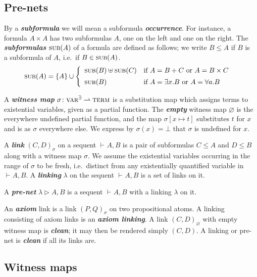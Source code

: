 \documentclass[UKenglish]{lipics-v2016}
\theoremstyle{plain}
\newcommand\defn[1]{\textit{\textbf{#1}}}
\newcommand\varE{\textsc{var}^\exists}
\newcommand\terms{\textsc{term}}
\newcommand\subs[1]{\textsc{sub}(#1)}
\newcommand\+{+}
\renewcommand\*{\times}
\newcommand\sub{\leq}
\newcommand\seq[3][]{{\vdash_{#1}}#2,#3}
\newcommand\net[3]{#1\triangleright #2,#3}
\newcommand\link[3][\sigma]{(#2,#3)_{#1}}
\begin{document}

\subsection{Pre-nets}

By a \defn{subformula} we will mean a subformula \defn{occurrence}. For instance, a formula $A\*A$ has two subformulas $A$, one on the left and one on the right. The \defn{subformulas} $\subs A$ of a formula are defined as follows; we write $B\sub A$ if $B$ is a subformula of $A$, i.e.\ if $B\in\subs A$.
\[
	\subs A = \{A\} \cup
	\left\{\begin{array}{ll}
		\subs B\uplus\subs C	& \text{if $A=B\+C$ or $A=B\*C$} \\[5pt]
		\subs B					& \text{if $A=\exists x.B$ or $A=\forall a.B$}
	\end{array}\right.
\]

A \defn{witness map} $\sigma\colon \varE \rightharpoonup \terms$ is a substitution map which assigns terms to existential variables, given as a partial function. The \defn{empty} witness map $\varnothing$ is the everywhere undefined partial function, and the map $\sigma[x\mapsto t]$ substitutes $t$ for $x$ and is as $\sigma$ everywhere else. We express by $\sigma(x)=\bot$ that $\sigma$ is undefined for $x$.

A \defn{link} $\link CD$ on a sequent $\seq AB$ is a pair of subformulas $C\leq A$ and $D\leq B$ along with a witness map $\sigma$. We assume the existential variables occurring in the range of $\sigma$ to be fresh, i.e.\ distinct from any existentially quantified variable in $\seq AB$. A \defn{linking} $\lambda$ on the sequent $\seq AB$ is a set of links on it.%

\begin{definition}
A \defn{pre-net} $\net\lambda AB$ is a sequent $\seq AB$ with a linking $\lambda$ on it.
\end{definition}

An \defn{axiom} link is a link $\link PQ$ on two propositional atoms. A linking consisting of axiom links is an \defn{axiom linking}. A link $\link[\varnothing]CD$ with empty witness map is \defn{clean}; it may then be rendered simply $(C,D)$. A linking or pre-net is \defn{clean} if all its links are.


\subsection{Witness maps}
\end{document}
